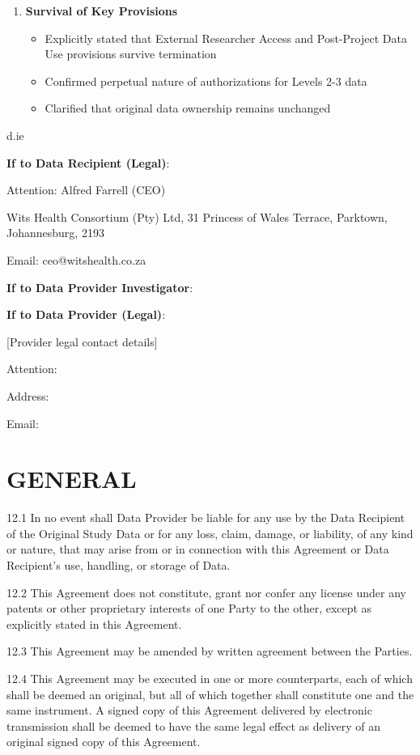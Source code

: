 \begin{enumerate}
\item \textbf{Survival of Key Provisions}
   \begin{itemize}
   \item Explicitly stated that External Researcher Access and Post-Project Data Use provisions survive termination
   \item Confirmed perpetual nature of authorizations for Levels 2-3 data
   \item Clarified that original data ownership remains unchanged
   \end{itemize}
\end{enumerate}

d.ie

\textbf{If to Data Recipient (Legal)}:

Attention: Alfred Farrell (CEO)

Wits Health Consortium (Pty) Ltd, 31 Princess of Wales Terrace, Parktown, Johannesburg, 2193

Email: ceo@witshealth.co.za

\textbf{If to Data Provider Investigator}:

\textbf{If to Data Provider (Legal)}:

[Provider legal contact details]

Attention:

Address:

Email:

\section{GENERAL}

12.1 In no event shall Data Provider be liable for any use by the Data Recipient of the Original Study Data or for any loss, claim, damage, or liability, of any kind or nature, that may arise from or in connection with this Agreement or Data Recipient's use, handling, or storage of Data.

12.2 This Agreement does not constitute, grant nor confer any license under any patents or other proprietary interests of one Party to the other, except as explicitly stated in this Agreement.

12.3 This Agreement may be amended by written agreement between the Parties.

12.4 This Agreement may be executed in one or more counterparts, each of which shall be deemed an original, but all of which together shall constitute one and the same instrument. A signed copy of this Agreement delivered by electronic transmission shall be deemed to have the same legal effect as delivery of an original signed copy of this Agreement.

